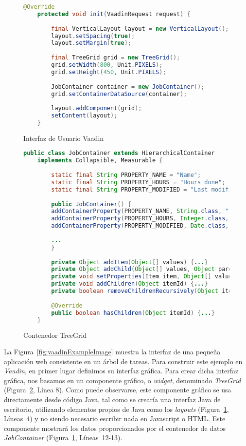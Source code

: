 \begin{figure}[H]
	\centering
	\begin{lstlisting}[language=Java]
	@Override
	protected void init(VaadinRequest request) {
	
		final VerticalLayout layout = new VerticalLayout();
		layout.setSpacing(true);
		layout.setMargin(true);
		
		final TreeGrid grid = new TreeGrid();
		grid.setWidth(800, Unit.PIXELS);
		grid.setHeight(450, Unit.PIXELS);
		
		JobContainer container = new JobContainer();
		grid.setContainerDataSource(container);
		
		layout.addComponent(grid);
		setContent(layout);
	}\end{lstlisting}
	\vspace{-15pt}
	\caption{Interfaz de Usuario Vaadin}
	\label{fig:uiVaadin}
\end{figure}

\begin{figure}[H]
	\centering
	\begin{lstlisting}[language=Java]
	public class JobContainer extends HierarchicalContainer
	implements Collapsible, Measurable {
	
		static final String PROPERTY_NAME = "Name";
		static final String PROPERTY_HOURS = "Hours done";
		static final String PROPERTY_MODIFIED = "Last modified";
		
		public JobContainer() {
		addContainerProperty(PROPERTY_NAME, String.class, "");
		addContainerProperty(PROPERTY_HOURS, Integer.class, 0);
		addContainerProperty(PROPERTY_MODIFIED, Date.class, new Date());
		
		...	
		}
		
		private Object addItem(Object[] values) {...}
		private Object addChild(Object[] values, Object parentId) {...}
		private void setProperties(Item item, Object[] values) {...}
		private void addChildren(Object itemId) {...}
		private boolean removeChildrenRecursively(Object itemId) {...}
		
		@Override
		public boolean hasChildren(Object itemId) {...}
	}
	\end{lstlisting}
	\caption{Contenedor TreeGrid}
	\label{fig:jobContainer}
\end{figure}

La Figura~\ref{fig:vaadinExampleImage} muestra la interfaz de una pequeña aplicación web consistente en un árbol de tareas. Para construir este ejemplo en \emph{Vaadin}, en primer lugar definimos su interfaz gráfica. Para crear dicha interfaz gráfica, nos basamos en un componente gráfico, o \emph{widget}, denominado \emph{TreeGrid}  (Figura~\ref{fig:jobContainer}, Línea 8). Como puede observarse, este componente gráfico se usa directamente desde código Java, tal como se crearía una interfaz Java de escritorio, utilizando elementos propios de Java como los \emph{layouts} (Figura~\ref{fig:uiVaadin}, Líneas~4) y no siendo necesario escribir nada en Javascript o HTML. Este componente mostrará los datos proporcionados por el contenedor de datos \emph{JobContainer} (Figura~\ref{fig:uiVaadin}, Líneas~12-13).

